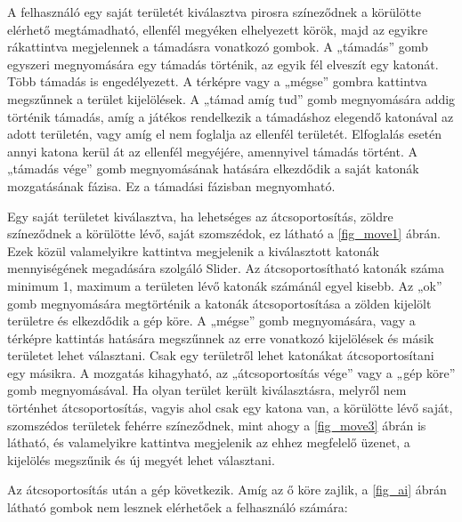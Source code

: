 

A felhasználó egy saját területét kiválasztva pirosra színeződnek a körülötte elérhető megtámadható, ellenfél megyéken elhelyezett körök, majd az egyikre rákattintva megjelennek a támadásra vonatkozó gombok. A „támadás” gomb egyszeri megnyomására egy támadás történik, az egyik fél elveszít egy katonát. Több támadás is engedélyezett. A térképre vagy a „mégse” gombra kattintva megszűnnek a terület kijelölések. A „támad amíg tud” gomb megnyomására addig történik támadás, amíg a játékos rendelkezik a támadáshoz elegendő katonával az adott területén, vagy amíg el nem foglalja az ellenfél területét. Elfoglalás esetén annyi katona kerül át az ellenfél megyéjére, amennyivel támadás történt. A „támadás vége” gomb megnyomásának hatására elkezdődik a saját katonák mozgatásának fázisa. Ez a támadási fázisban megnyomható. 


%




Egy saját területet kiválasztva, ha lehetséges az átcsoportosítás, zöldre színeződnek a körülötte lévő, saját szomszédok, ez látható a \ref{fig_move1} ábrán. Ezek közül valamelyikre kattintva megjelenik a kiválasztott katonák mennyiségének megadására szolgáló Slider. Az átcsoportosítható katonák száma minimum 1, maximum a területen lévő katonák számánál egyel kisebb. Az „ok” gomb megnyomására megtörténik a katonák átcsoportosítása a zölden kijelölt területre és elkezdődik a gép köre. A „mégse” gomb megnyomására, vagy a térképre kattintás hatására megszűnnek az erre vonatkozó kijelölések és másik területet lehet választani. Csak egy területről lehet katonákat átcsoportosítani egy másikra. A mozgatás kihagyható, az „átcsoportosítás vége” vagy a „gép köre” gomb megnyomásával. Ha olyan terület került kiválasztásra, melyről nem történhet átcsoportosítás, vagyis ahol csak egy katona van, a körülötte lévő saját, szomszédos területek fehérre színeződnek, mint ahogy a \ref{fig_move3} ábrán is látható, és valamelyikre kattintva megjelenik az ehhez megfelelő üzenet, a kijelölés megszűnik és új megyét lehet választani.  

 


Az átcsoportosítás után a gép következik. Amíg az ő köre zajlik, a \ref{fig_ai} ábrán látható gombok nem lesznek elérhetőek a felhasználó számára: 

